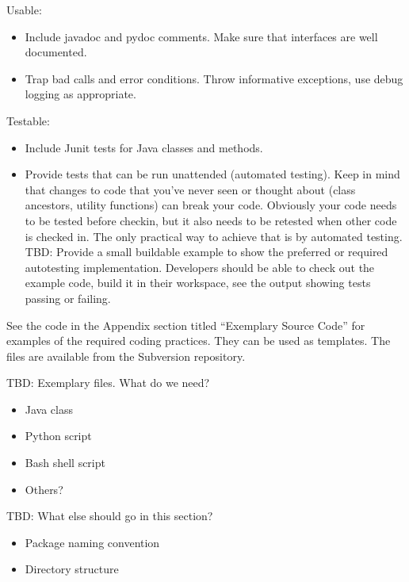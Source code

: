 Usable:
\begin{itemize}
\item
Include javadoc and pydoc comments.  Make sure that interfaces are well
documented.  
\item
Trap bad calls and error conditions.  Throw informative exceptions, 
use debug logging as appropriate.
\end{itemize}

Testable:
\begin{itemize}
\item
Include Junit tests for Java classes and methods.
\item
Provide tests that can be run unattended (automated
testing).  Keep in mind that changes to code
that you've never seen or thought about (class ancestors,
utility functions) can break your code.  Obviously your 
code needs to be tested before checkin, but it also needs
to be retested when other code is checked in.  The only
practical way to achieve that is by automated testing.
TBD: Provide a small buildable example to show the preferred
or required autotesting implementation.  Developers should
be able to check out the example code, build it in their
workspace, see the output showing tests passing or failing.
\end{itemize}

See the code in the Appendix section titled ``Exemplary
Source Code'' for examples of the required 
coding practices.  They can be used as templates.  The files 
are available from the Subversion repository.

TBD: Exemplary files.  What do we need?
\begin{itemize}
\item
Java class
\item
Python script
\item
Bash shell script
\item
Others?
\end{itemize}

TBD: What else should go in this section?
\begin{itemize}
\item
Package naming convention
\item
Directory structure
\end{itemize}




